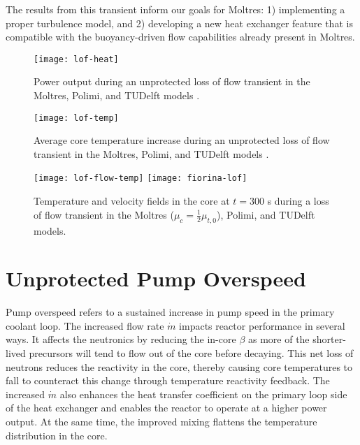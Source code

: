 The results from this transient inform our goals for Moltres: 1)
implementing a proper turbulence model, and
2) developing a new heat exchanger feature that is compatible with the
buoyancy-driven flow capabilities already present in Moltres.

\begin{figure}[htbp!]
    \centering
    \texttt{[image: lof-heat]}
    \caption{Power output during
    an unprotected loss of flow transient in the Moltres, Polimi, and
    TUDelft models \cite{fiorina_modelling_2014}.}
    \label{fig:lofheat}
    \texttt{[image: lof-temp]}
    \caption{Average core temperature increase during
    an unprotected loss of flow transient in the Moltres, Polimi, and
    TUDelft models \cite{fiorina_modelling_2014}.}
    \label{fig:loftemp}
\end{figure}

\clearpage

\begin{figure}[htbp!]
    \centering
    \texttt{[image: lof-flow-temp]}
    \texttt{[image: fiorina-lof]}
    \caption{Temperature and velocity fields in the core at $t=300$ s during
    a loss of flow transient in the Moltres ($\mu_c = \frac{1}{2} \mu_{t,0}$),
    Polimi, and TUDelft models.}
    \label{fig:lofflowtemp}
\end{figure}

\section{Unprotected Pump Overspeed}

Pump overspeed refers to a sustained
increase in pump speed in the primary coolant loop. The increased flow rate
$\dot{m}$ impacts reactor performance in several ways.
It affects the neutronics by reducing the in-core $\beta$ as more of the
shorter-lived precursors will tend to flow out of the core before decaying.
This net loss of neutrons reduces the reactivity in the core, thereby causing
core temperatures to fall to counteract this change through temperature
reactivity feedback. The increased $\dot{m}$ also enhances the heat transfer
coefficient on the primary loop side of the heat exchanger and enables the
reactor to operate at a higher power output. At the same time, the improved
mixing flattens the temperature distribution in the core.

